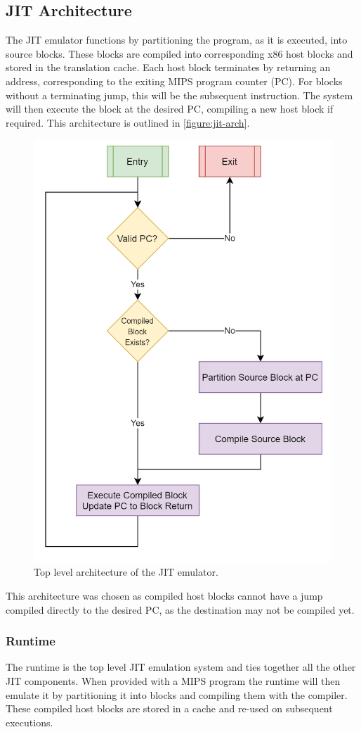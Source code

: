 \subsection{JIT Architecture}
\label{section:jit-arch}

The JIT emulator functions by partitioning the program, as it is executed, into source blocks. These blocks are compiled into corresponding x86 host blocks and stored in the translation cache. Each host block terminates by returning an address, corresponding to the exiting MIPS program counter (PC). For blocks without a terminating jump, this will be the subsequent instruction. The system will then execute the block at the desired PC, compiling a new host block if required. This architecture is outlined in \autoref{figure:jit-arch}.

\begin{figure}[h]
    \centering
    \includegraphics[width=0.5\linewidth]{diagrams/jit.png}
    \caption{Top level architecture of the JIT emulator.}
    \label{figure:jit-arch}
\end{figure}

This architecture was chosen as compiled host blocks cannot have a jump compiled directly to the desired PC, as the destination may not be compiled yet.

\subsubsection{Runtime}

The runtime is the top level JIT emulation system and ties together all the other JIT components. When provided with a MIPS program the runtime will then emulate it by partitioning it into blocks and compiling them with the compiler. These compiled host blocks are stored in a cache and re-used on subsequent executions.

